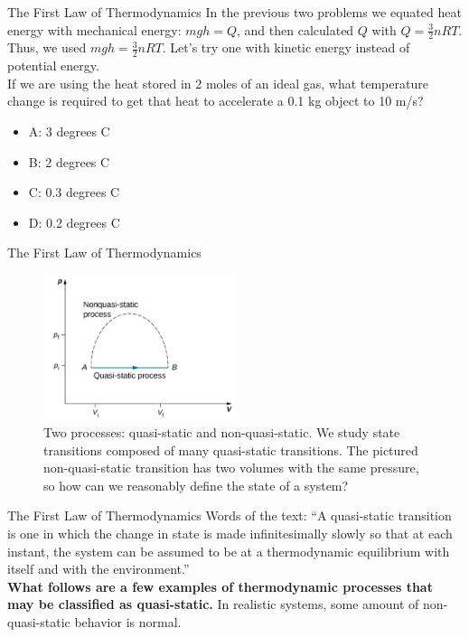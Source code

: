 \documentclass{beamer}
\begin{document}
\begin{frame}{The First Law of Thermodynamics}
In the previous two problems we equated heat energy with mechanical energy: $mgh = Q$, and then calculated $Q$ with $Q=\frac{3}{2}nRT$.  Thus, we used $mgh = \frac{3}{2}nRT$.  Let's try one with kinetic energy instead of potential energy. \\ \vspace{0.5cm}
If we are using the heat stored in 2 moles of an ideal gas, what temperature change is required to get that heat to accelerate a 0.1 kg object to 10 m/s?
\begin{itemize}
\item A: 3 degrees C
\item B: 2 degrees C
\item C: 0.3 degrees C
\item D: 0.2 degrees C
\end{itemize} 
\end{frame}

\begin{frame}{The First Law of Thermodynamics}
\begin{figure}
\centering
\includegraphics[width=0.5\textwidth]{figures/process.png}
\caption{\label{fig:process} Two processes: quasi-static and non-quasi-static.  We study state transitions composed of many quasi-static transitions.  The pictured non-quasi-static transition has two volumes with the same pressure, so how can we reasonably define the state of a system?}
\end{figure} 
\end{frame}

\begin{frame}{The First Law of Thermodynamics}
Words of the text: ``A quasi-static transition is one in which the change in state is made infinitesimally slowly so that at each instant, the system can be assumed to be at a thermodynamic equilibrium with itself and with the environment.'' \\ \vspace{0.5cm}
\textbf{What follows are a few examples of thermodynamic processes that may be classified as quasi-static.} In realistic systems, some amount of non-quasi-static behavior is normal.
\end{frame}
\end{document}

